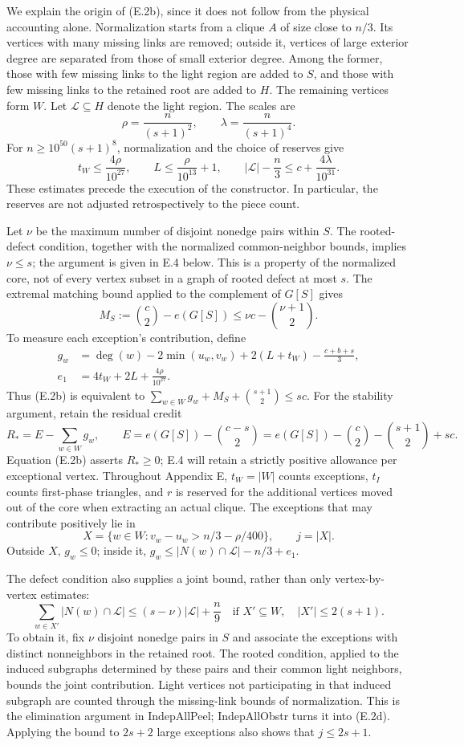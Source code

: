 \documentclass[english,11pt,a4paper]{article}
\newcounter{none}
\begin{document}
We explain the origin of (E.2b), since it does not follow from the physical accounting alone. Normalization starts from a clique \(A\) of size close to \(n/3\). Its vertices with many missing links are removed; outside it, vertices of large exterior degree are separated from those of small exterior degree. Among the former, those with few missing links to the light region are added to \(S\), and those with few missing links to the retained root are added to \(H\). The remaining vertices form \(W\). Let \(\mathcal L\subseteq H\) denote the light region. The scales are \[
\rho=\frac{n}{(s+1)^2},\qquad \lambda=\frac{n}{(s+1)^4}.
\] For \(n\ge10^{50}(s+1)^8\), normalization and the choice of reserves give \[
t_W\le\frac{4\rho}{10^{27}},\qquad
L\le\frac{\rho}{10^{13}}+1,\qquad
|\mathcal L|-\frac n3\le c+\frac{4\lambda}{10^{31}}.
\] These estimates precede the execution of the constructor. In particular, the reserves are not adjusted retrospectively to the piece count.

Let \(\nu\) be the maximum number of disjoint nonedge pairs within \(S\). The rooted-defect condition, together with the normalized common-neighbor bounds, implies \(\nu\le s\); the argument is given in E.4 below. This is a property of the normalized core, not of every vertex subset in a graph of rooted defect at most \(s\). The extremal matching bound applied to the complement of \(G[S]\) gives \[
M_S:=\binom c2-e(G[S])\le \nu c-\binom{\nu+1}2.
\] To measure each exception's contribution, define \[
\begin{split}
g_w&=\deg(w)-2\min(u_w,v_w)+2(L+t_W)-\frac{c+b+s}{3},\\
e_1&=4t_W+2L+\frac{4\rho}{10^{27}}.
\end{split}
\] Thus (E.2b) is equivalent to \(\sum_{w\in W}g_w+M_S+\binom{s+1}2\le sc\). For the stability argument, retain the residual credit \[
R_*=E-\sum_{w\in W}g_w,\qquad
E=e(G[S])-\binom{c-s}{2}
  =e(G[S])-\binom c2-\binom{s+1}2+sc.
\] Equation (E.2b) asserts \(R_*\ge0\); E.4 will retain a strictly positive allowance per exceptional vertex. Throughout Appendix E, \(t_W=|W|\) counts exceptions, \(t_I\) counts first-phase triangles, and \(r\) is reserved for the additional vertices moved out of the core when extracting an actual clique. The exceptions that may contribute positively lie in \[
X=\{w\in W:v_w-u_w>n/3-\rho/400\},\qquad j=|X|.
\] Outside \(X\), \(g_w\le0\); inside it, \(g_w\le |N(w)\cap\mathcal L|-n/3+e_1\).

The defect condition also supplies a joint bound, rather than only vertex-by-vertex estimates: \[
\sum_{w\in X'}|N(w)\cap\mathcal L|
\le (s-\nu)|\mathcal L|+\frac n9
\quad\text{if }X'\subseteq W,\quad |X'|\le2(s+1).
\tag{E.2d}
\] To obtain it, fix \(\nu\) disjoint nonedge pairs in \(S\) and associate the exceptions with distinct nonneighbors in the retained root. The rooted condition, applied to the induced subgraphs determined by these pairs and their common light neighbors, bounds the joint contribution. Light vertices not participating in that induced subgraph are counted through the missing-link bounds of normalization. This is the elimination argument in IndepAllPeel; IndepAllObstr turns it into (E.2d). Applying the bound to \(2s+2\) large exceptions also shows that \(j\le2s+1\).
\end{document}
